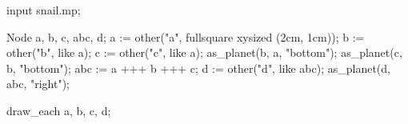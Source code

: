 \usemodule[zhfonts]
\startMPpage
input snail.mp;

Node a, b, c, abc, d;
a := other("a", fullsquare xysized (2cm, 1cm));
b := other("b", like a);
c := other("c", like a);
as_planet(b, a, "bottom");
as_planet(c, b, "bottom");
abc := a +++ b +++ c;
d := other("d", like abc);
as_planet(d, abc, "right");

draw_each a, b, c, d;
\stopMPpage
